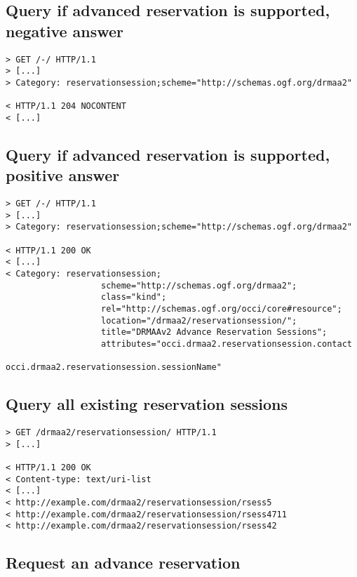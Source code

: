 \documentclass[10pt]{article}
\begin{document}
\subsection{Query if advanced reservation is supported, negative answer}

\begin{verbatim}
> GET /-/ HTTP/1.1
> [...]
> Category: reservationsession;scheme="http://schemas.ogf.org/drmaa2" 

< HTTP/1.1 204 NOCONTENT 
< [...]
\end{verbatim}


\subsection{Query if advanced reservation is supported, positive answer}

\begin{verbatim}
> GET /-/ HTTP/1.1
> [...]
> Category: reservationsession;scheme="http://schemas.ogf.org/drmaa2" 

< HTTP/1.1 200 OK 
< [...]
< Category: reservationsession;
                   scheme="http://schemas.ogf.org/drmaa2";
                   class="kind";
                   rel="http://schemas.ogf.org/occi/core#resource";
                   location="/drmaa2/reservationsession/";
                   title="DRMAAv2 Advance Reservation Sessions";
                   attributes="occi.drmaa2.reservationsession.contact 
                               occi.drmaa2.reservationsession.sessionName"
\end{verbatim}

\subsection{Query all existing reservation sessions}

\begin{verbatim}
> GET /drmaa2/reservationsession/ HTTP/1.1
> [...]

< HTTP/1.1 200 OK 
< Content-type: text/uri-list
< [...]
< http://example.com/drmaa2/reservationsession/rsess5
< http://example.com/drmaa2/reservationsession/rsess4711
< http://example.com/drmaa2/reservationsession/rsess42
\end{verbatim}

\subsection{Request an advance reservation}
\end{document}
